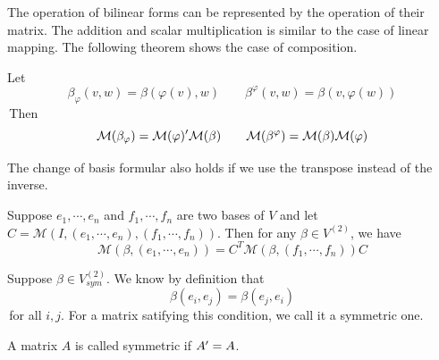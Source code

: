 The operation of bilinear forms can be represented by the operation of their matrix. The addition and scalar multiplication is similar to the case of linear mapping. 
The following theorem shows the case of composition.
\begin{theorem}
    Let $$\beta_{\varphi}(v,w) = \beta(\varphi(v),w) \qquad \beta^{\varphi}(v,w) = \beta(v,\varphi(w))$$
    \,Then $$\mathcal{M}(\beta_{\varphi}) = \mathcal{M}(\varphi) ^{\prime} \mathcal{M}(\beta) \qquad \mathcal{M}(\beta^{\varphi}) = \mathcal{M}(\beta) \mathcal{M}(\varphi)$$
\end{theorem} 

The change of basis formular also holds if we use the transpose instead of the inverse.
\begin{theorem}
    Suppose $e_1,\cdots,e_n$ and $f_1,\cdots, f_n$ are two bases of $V$ and let $C= \mathcal{M}(I,(e_1,\cdots,e_n),(f_1,\cdots, f_n))$. Then for any $\beta \in V^{(2)}$, we have
    $$\mathcal{M}(\beta,(e_1,\cdots,e_n)) = C^T \mathcal{M}(\beta,(f_1,\cdots,f_n)) C$$
\end{theorem}

Suppose $\beta \in V^{(2)}_{sym}$. We know by definition that 
\begin{equation} \label{equ: symmatrix}
    \beta(e_i,e_j) = \beta(e_j,e_i)
\end{equation}
\,for all $i,j$. For a matrix satifying this condition, we call it a symmetric one.
\begin{definition}
    A matrix $A$ is called symmetric if $A^{\prime} = A$.
\end{definition}

